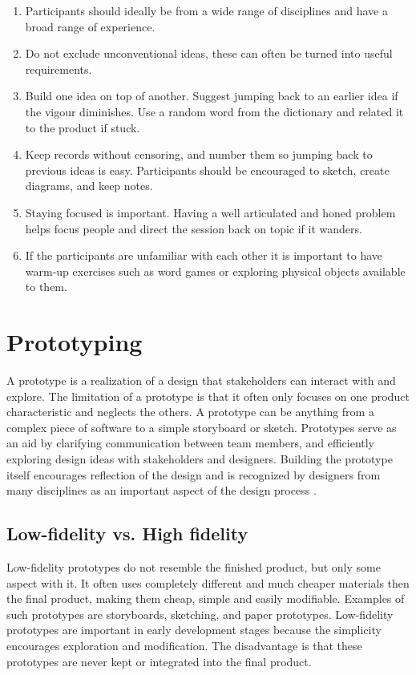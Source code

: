 \begin{enumerate}
  \item Participants should ideally be from a wide range of disciplines and have a broad range of experience.
  \item Do not exclude unconventional ideas, these can often be turned into useful requirements.
  \item Build one idea on top of another. Suggest jumping back to an earlier idea if the vigour diminishes. Use a random word from the dictionary and related it to the product if stuck.
  \item Keep records without censoring, and number them so jumping back to previous ideas is easy. Participants should be encouraged to sketch, create diagrams, and keep notes.
  \item Staying focused is important. Having a well articulated and honed problem helps focus people and direct the session back on topic if it wanders.
  \item If the participants are unfamiliar with each other it is important to have warm-up exercises such as word games or exploring physical objects available to them.
\end{enumerate}

\section{Prototyping}
A prototype is a realization of a design that stakeholders can interact with and explore. The limitation of a prototype is that it often only focuses on one product characteristic and neglects the others. A prototype can be anything from a complex piece of software to a simple storyboard or sketch. Prototypes serve as an aid by clarifying communication between team members, and efficiently exploring design ideas with stakeholders and designers. Building the prototype itself encourages reflection of the design and is recognized by designers from many disciplines as an important aspect of the design process \cite{interactionDesign}.

\subsection{Low-fidelity vs. High fidelity}
Low-fidelity prototypes do not resemble the finished product, but only some aspect with it. It often uses completely different and much cheaper materials then the final product, making them cheap, simple and easily modifiable. Examples of such prototypes are storyboards, sketching, and paper prototypes. Low-fidelity prototypes are important in early development stages because the simplicity encourages exploration and modification. The disadvantage is that these prototypes are never kept or integrated into the final product.

